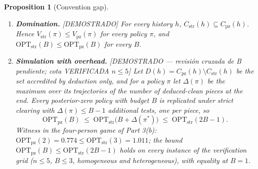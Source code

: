 \documentclass[11pt]{article}
\newtheorem{proposition}{Proposition}
\theoremstyle{remark}
\newcommand{\pz}{\mathrm{pz}}
\newcommand{\str}{\mathrm{str}}
\newcommand{\OPT}{\mathrm{OPT}}
\newcommand{\lab}[1]{\textcolor{blue!60!black}{\textsf{\small [#1]}}}
\newcommand{\Cstr}{C_{\str}}
\newcommand{\Cpz}{C_{\pz}}
\begin{document}
\begin{proposition}[Convention gap]\label{prop:gap}
\leavevmode
\begin{enumerate}
\item[\textbf{1.}] \textbf{Domination.} \lab{DEMOSTRADO} For every history $h$, $\Cstr(h)\subseteq\Cpz(h)$. Hence $V_\str(\pi)\le V_\pz(\pi)$ for every policy $\pi$, and $\OPT_\str(B)\le\OPT_\pz(B)$ for every $B$.

\item[\textbf{2.}] \textbf{Simulation with overhead.} \lab{DEMOSTRADO --- revisión cruzada de B pendiente; cota VERIFICADA $n\le5$} Let $D(h)=\Cpz(h)\setminus\Cstr(h)$ be the set accredited by deduction only, and for a policy $\pi$ let $\Delta(\pi)$ be the maximum over its trajectories of the number of deduced-clean pieces at the end. Every posterior-zero policy with budget $B$ is replicated under strict clearing with $\Delta(\pi)\le B-1$ additional tests, one per piece, so
\[
\OPT_\pz(B)\;\le\;\OPT_\str\big(B+\Delta(\pi^*)\big)\;\le\;\OPT_\str(2B-1).
\]
Witness in the four-person game of Part 3(b): $\OPT_\pz(2)=0.774\le\OPT_\str(3)=1.011$; the bound $\OPT_\pz(B)\le\OPT_\str(2B-1)$ holds on every instance of the verification grid ($n\le5$, $B\le3$, homogeneous and heterogeneous), with equality at $B=1$.


\end{enumerate}
\end{proposition}
\end{document}
